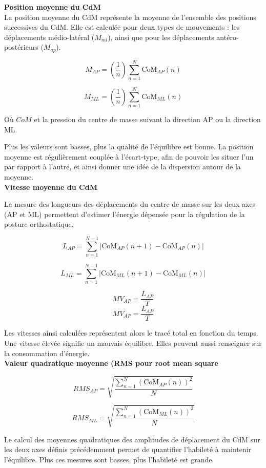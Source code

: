 \textbf{Position moyenne du CdM}\\


La position moyenne du CdM représente la moyenne de l'ensemble des positions successives du CdM. 
Elle est calculée pour deux types de mouvements : les déplacements médio-latéral ($M_{ml}$), ainsi que pour les déplacements antéro-postérieurs ($M_{ap}$).

\[
M_{AP} = \left( \frac{1}{n} \right) \sum_{n=1}^N \mbox{CoM}_{AP}(n) \tag{2}
\]

\[
M_{ML} = \left( \frac{1}{n} \right) \sum_{n=1}^N \mbox{CoM}_{ML}(n) \tag{3}
\]

Où $CoM$ et la pression du centre de masse suivant la direction AP ou la direction ML.

Plus les valeurs sont basses, plus la qualité de l'équilibre est bonne. 
La position moyenne est régulièrement couplée à l'écart-type, afin de pouvoir les situer l'un par rapport à l'autre, et ainsi donner une idée de la dispersion autour de la moyenne.\\

\textbf{Vitesse moyenne du CdM}


La mesure des longueurs des déplacements du centre de masse sur les deux axes (AP et ML) permettent d'estimer l'énergie dépensée pour la régulation de la posture orthostatique.

\[
L_{AP} = \sum_{n=1}^{N-1} \left| \mbox{CoM}_{AP}(n+1) - \mbox{CoM}_{AP}(n) \right| \tag{4}
\]

\[
L_{ML} = \sum_{n=1}^{N-1} \left| \mbox{CoM}_{ML}(n+1) - \mbox{CoM}_{ML}(n) \right| \tag{5}
\]

\[
MV_{AP} = \frac{L_{AP}}{T} \tag{6}
\]
\[
MV_{AP} = \frac{L_{AP}}{T} \tag{7} 
\]

Les vitesses ainsi calculées représentent alors le tracé total en fonction du temps. 
Une vitesse élevée signifie un mauvais équilibre. 
Elles peuvent aussi renseigner sur la consommation d'énergie.\\

\textbf{Valeur quadratique moyenne (RMS pour root mean square}


\[
RMS_{AP} =\sqrt{  \frac{\sum_{n=1}^{N} \left (\text{CoM}_{AP}(n) \right)^2 }{N}}  \tag{8}
\]

\[
RMS_{ML} =\sqrt{  \frac{\sum_{n=1}^{N} \left (\text{CoM}_{ML}(n) \right)^2 }{N}}  \tag{9}
\]

Le calcul des moyennes quadratiques des amplitudes de déplacement du CdM sur les deux axes définis précédemment permet de quantifier l'habileté à maintenir l'équilibre. 
Plus ces mesures sont basses, plus l'habileté est grande.\\

